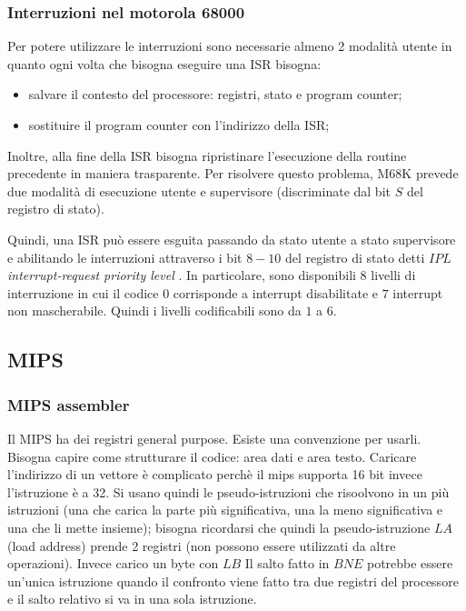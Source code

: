 \documentclass{article}
\begin{document}
\subsubsection{Interruzioni nel motorola 68000}
Per potere utilizzare le interruzioni sono necessarie almeno 2 modalità utente in 
quanto ogni volta che bisogna eseguire una ISR bisogna:
\begin{itemize}
  \item salvare il contesto del processore: registri, stato e program counter;
  \item sostituire il program counter con l'indirizzo della ISR;
\end{itemize}

Inoltre, alla fine della ISR bisogna ripristinare l'esecuzione della routine
precedente in maniera trasparente. Per risolvere questo problema, M68K prevede due modalità di 
esecuzione utente e supervisore (discriminate dal bit $S$ del registro di stato).

Quindi, una ISR può essere esguita passando da stato utente a stato supervisore e 
abilitando le interruzioni attraverso i bit $8-10$ del registro di stato detti $IPL$
\textit{interrupt-request priority level} . In particolare, sono disponibili 8 
livelli di interruzione in cui il codice $0$ corrisponde a interrupt disabilitate
e $7$ interrupt non mascherabile. Quindi i livelli codificabili sono da $1$ a $6$.

\subsection{MIPS}

\subsubsection{MIPS assembler}
Il MIPS ha dei registri general purpose. Esiste una convenzione per usarli. 
Bisogna capire come strutturare il codice: area dati e area testo.
Caricare l'indirizzo di un vettore è complicato perchè il mips supporta 16 bit 
invece l'istruzione è a 32. Si usano quindi le pseudo-istruzioni che risoolvono 
in un più istruzioni (una che carica la parte più significativa, una la meno 
significativa e una che li mette insieme); bisogna ricordarsi che quindi la 
pseudo-istruzione $LA$ (load address) prende 2 registri (non possono essere 
utilizzati da altre operazioni). Invece carico un byte con $LB$
Il salto fatto in $BNE$ potrebbe essere un'unica istruzione quando il confronto 
viene fatto tra due registri del processore e il salto relativo si va in una sola 
istruzione.
\end{document}
